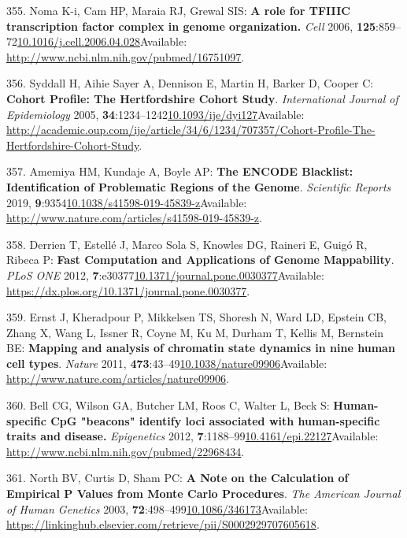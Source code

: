 \documentclass[
]{book}
\begin{document}
\leavevmode\hypertarget{ref-Noma2006}{}%
355. Noma K-i, Cam HP, Maraia RJ, Grewal SIS: \textbf{A role for TFIIIC transcription factor complex in genome organization.} \emph{Cell} 2006, \textbf{125}:859--72\href{https://doi.org/10.1016/j.cell.2006.04.028}{10.1016/j.cell.2006.04.028}Available: \url{http://www.ncbi.nlm.nih.gov/pubmed/16751097}.

\leavevmode\hypertarget{ref-Syddall2005}{}%
356. Syddall H, Aihie Sayer A, Dennison E, Martin H, Barker D, Cooper C: \textbf{Cohort Profile: The Hertfordshire Cohort Study}. \emph{International Journal of Epidemiology} 2005, \textbf{34}:1234--1242\href{https://doi.org/10.1093/ije/dyi127}{10.1093/ije/dyi127}Available: \url{http://academic.oup.com/ije/article/34/6/1234/707357/Cohort-Profile-The-Hertfordshire-Cohort-Study}.

\leavevmode\hypertarget{ref-Amemiya2019}{}%
357. Amemiya HM, Kundaje A, Boyle AP: \textbf{The ENCODE Blacklist: Identification of Problematic Regions of the Genome}. \emph{Scientific Reports} 2019, \textbf{9}:9354\href{https://doi.org/10.1038/s41598-019-45839-z}{10.1038/s41598-019-45839-z}Available: \url{http://www.nature.com/articles/s41598-019-45839-z}.

\leavevmode\hypertarget{ref-Derrien2012}{}%
358. Derrien T, Estellé J, Marco Sola S, Knowles DG, Raineri E, Guigó R, Ribeca P: \textbf{Fast Computation and Applications of Genome Mappability}. \emph{PLoS ONE} 2012, \textbf{7}:e30377\href{https://doi.org/10.1371/journal.pone.0030377}{10.1371/journal.pone.0030377}Available: \url{https://dx.plos.org/10.1371/journal.pone.0030377}.

\leavevmode\hypertarget{ref-Ernst2011}{}%
359. Ernst J, Kheradpour P, Mikkelsen TS, Shoresh N, Ward LD, Epstein CB, Zhang X, Wang L, Issner R, Coyne M, Ku M, Durham T, Kellis M, Bernstein BE: \textbf{Mapping and analysis of chromatin state dynamics in nine human cell types}. \emph{Nature} 2011, \textbf{473}:43--49\href{https://doi.org/10.1038/nature09906}{10.1038/nature09906}Available: \url{http://www.nature.com/articles/nature09906}.

\leavevmode\hypertarget{ref-Bell2012a}{}%
360. Bell CG, Wilson GA, Butcher LM, Roos C, Walter L, Beck S: \textbf{Human-specific CpG "beacons" identify loci associated with human-specific traits and disease.} \emph{Epigenetics} 2012, \textbf{7}:1188--99\href{https://doi.org/10.4161/epi.22127}{10.4161/epi.22127}Available: \url{http://www.ncbi.nlm.nih.gov/pubmed/22968434}.

\leavevmode\hypertarget{ref-North2003}{}%
361. North BV, Curtis D, Sham PC: \textbf{A Note on the Calculation of Empirical P Values from Monte Carlo Procedures}. \emph{The American Journal of Human Genetics} 2003, \textbf{72}:498--499\href{https://doi.org/10.1086/346173}{10.1086/346173}Available: \url{https://linkinghub.elsevier.com/retrieve/pii/S0002929707605618}.
\end{document}

